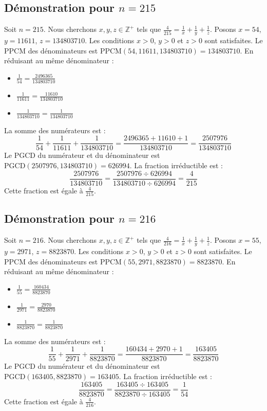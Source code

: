 \documentclass[11pt,a4paper]{article}
\begin{document}
\subsection{Démonstration pour $n = 215$}
Soit $n = 215$. Nous cherchons $x, y, z \in \mathbb{Z}^{+}$ tels que $\frac{4}{215} = \frac{1}{x} + \frac{1}{y} + \frac{1}{z}$.
Posons $x = 54$, $y = 11611$, $z = 134803710$.
Les conditions $x > 0$, $y > 0$ et $z > 0$ sont satisfaites.
Le PPCM des dénominateurs est $\text{PPCM}(54, 11611, 134803710) = 134803710$.
En réduisant au même dénominateur :
\begin{itemize}
    \item $\frac{1}{54} = \frac{2496365}{134803710}$
    \item $\frac{1}{11611} = \frac{11610}{134803710}$
    \item $\frac{1}{134803710} = \frac{1}{134803710}$
\end{itemize}
La somme des numérateurs est :
$$ \frac{1}{54} + \frac{1}{11611} + \frac{1}{134803710} = \frac{2496365 + 11610 + 1}{134803710} = \frac{2507976}{134803710} $$
Le PGCD du numérateur et du dénominateur est $\text{PGCD}(2507976, 134803710) = 626994$.
La fraction irréductible est :
$$ \frac{2507976}{134803710} = \frac{2507976 \div 626994}{134803710 \div 626994} = \frac{4}{215} $$
Cette fraction est égale à $\frac{4}{215}$.

\subsection{Démonstration pour $n = 216$}
Soit $n = 216$. Nous cherchons $x, y, z \in \mathbb{Z}^{+}$ tels que $\frac{4}{216} = \frac{1}{x} + \frac{1}{y} + \frac{1}{z}$.
Posons $x = 55$, $y = 2971$, $z = 8823870$.
Les conditions $x > 0$, $y > 0$ et $z > 0$ sont satisfaites.
Le PPCM des dénominateurs est $\text{PPCM}(55, 2971, 8823870) = 8823870$.
En réduisant au même dénominateur :
\begin{itemize}
    \item $\frac{1}{55} = \frac{160434}{8823870}$
    \item $\frac{1}{2971} = \frac{2970}{8823870}$
    \item $\frac{1}{8823870} = \frac{1}{8823870}$
\end{itemize}
La somme des numérateurs est :
$$ \frac{1}{55} + \frac{1}{2971} + \frac{1}{8823870} = \frac{160434 + 2970 + 1}{8823870} = \frac{163405}{8823870} $$
Le PGCD du numérateur et du dénominateur est $\text{PGCD}(163405, 8823870) = 163405$.
La fraction irréductible est :
$$ \frac{163405}{8823870} = \frac{163405 \div 163405}{8823870 \div 163405} = \frac{1}{54} $$
Cette fraction est égale à $\frac{4}{216}$.
\end{document}
